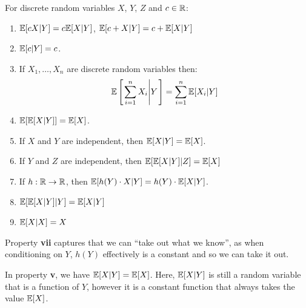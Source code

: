 \documentclass[../main.tex]{subfiles}
\begin{document}
\begin{proposition}
  For discrete random variables $X$, $Y$, $Z$ and $c \in \mathbb{R}$:
  \label{conditionalExpectationProp}
  \begin{enumerate}
    \item $\mathbb{E}[cX \vert Y] = c \mathbb{E}[X \vert Y]$, $\mathbb{E}[c + X \vert Y] = c + \mathbb{E}[X \vert Y]$
    \item $\mathbb{E}[c \vert Y] = c$.
    \item If $X_1, \ldots, X_n$ are discrete random variables then:
      \[
        \mathbb{E}\left[\left. \sum_{i = 1}^{n} X_i \middle\vert Y \right.\right] = \sum_{i = 1}^{n} \mathbb{E}[X_i \vert Y]
      \]
    \item $\mathbb{E}[\mathbb{E}[X \vert Y]] = \mathbb{E}[X]$.
    \item If $X$ and $Y$ are independent, then $\mathbb{E}[X \vert Y] = \mathbb{E}[X]$.
    \item If $Y$ and $Z$ are independent, then $\mathbb{E}[\mathbb{E}[X \vert Y] \vert Z] = \mathbb{E}[X]$
    \item If $h: \mathbb{R} \to \mathbb{R}$, then $\mathbb{E}[h(Y) \cdot X \vert Y] = h(Y) \cdot \mathbb{E}[X \vert Y]$.
    \item $\mathbb{E}[\mathbb{E}[X \vert Y] \vert Y] = \mathbb{E}[X \vert Y]$
    \item $\mathbb{E}[X \vert X] = X$
  \end{enumerate}
\end{proposition}
\begin{remark}
  Property \textbf{vii} captures that we can ``take out what we know'', as when conditioning on $Y$, $h(Y)$ effectively is a constant and so we can take it out.
\end{remark}
\begin{remark}[Note]
  In property \textbf{v}, we have $\mathbb{E}[X \vert Y] = \mathbb{E}[X]$.
  Here, $\mathbb{E}[X \vert Y]$ is still a random variable that is a function of $Y$, however it is a constant function that always takes the value $\mathbb{E}[X]$.
\end{remark}
\end{document}
